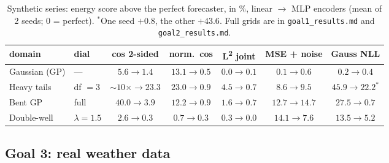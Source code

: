 \documentclass[11pt]{article}
\newcommand{\Ltwo}{L\textsuperscript{2}}
\begin{document}
\begin{table}[h]
\centering
\small
\begin{tabular}{@{}llccccc@{}}
\toprule
domain & dial & cos 2-sided & norm.\ cos & \Ltwo{} joint & MSE + noise & Gauss NLL \\
\midrule
Gaussian (GP)  & ---          & $5.6 \to 1.4$ & $13.1 \to 0.5$ & $0.0 \to 0.1$ & $0.1 \to 0.6$ & $0.2 \to 0.4$ \\
Heavy tails    & df $=3$      & ${\sim}10\times \to 23.3$ & $23.0 \to \mathbf{0.9}$ & $4.5 \to \mathbf{0.7}$ & $8.6 \to 9.5$ & $45.9 \to 22.2^{*}$ \\
Bent GP        & full         & $40.0 \to 3.9$ & $12.2 \to 0.9$ & $1.6 \to 0.7$ & $12.7 \to 14.7$ & $27.5 \to 0.7$ \\
Double-well    & $\lambda=1.5$ & $2.6 \to 0.3$ & $0.7 \to 0.3$ & $0.3 \to 0.0$ & $14.1 \to 7.6$ & $13.5 \to 5.2$ \\
\bottomrule
\end{tabular}
\caption{Synthetic series: energy score above the perfect forecaster, in \%,
linear $\to$ MLP encoders (mean of 2 seeds; 0 = perfect). $^{*}$One seed $+0.8$, the
other $+43.6$. Full grids are in \texttt{goal1\_results.md} and \texttt{goal2\_results.md}.}
\label{tab:synthetic}
\end{table}

\subsection{Goal 3: real weather data}
\end{document}
